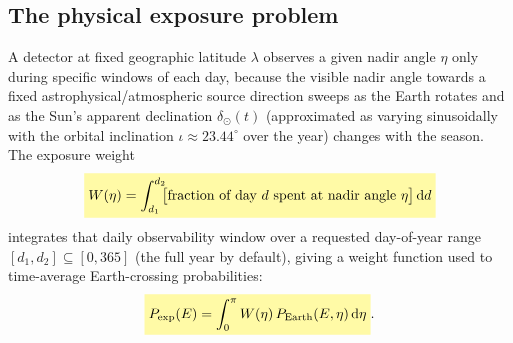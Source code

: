
\begin{theorybox}
\subsection*{The physical exposure problem}
A detector at fixed geographic latitude $\lambda$ observes a given nadir
angle $\eta$ only during specific windows of each day, because the visible
nadir angle towards a fixed astrophysical/atmospheric source direction
sweeps as the Earth rotates and as the Sun's apparent declination
$\delta_\odot(t)$ (approximated as varying sinusoidally with the orbital
inclination $\iota\approx23.44^\circ$ over the year) changes with the
season. The exposure weight
\begin{equation}
  \keyresult{W(\eta) = \int_{d_1}^{d_2}\!\!\bigl[\text{fraction of day } d \text{ spent at nadir angle }\eta\bigr]\,\mathrm{d}d}
\end{equation}
integrates that daily observability window over a requested day-of-year
range $[d_1,d_2]\subseteq[0,365]$ (the full year by default), giving a
weight function used to time-average Earth-crossing probabilities:
\begin{equation}
  \keyresult{P_{\rm exp}(E) = \int_0^\pi W(\eta)\,P_{\rm Earth}(E,\eta)\,\mathrm{d}\eta}.
\end{equation}


\end{theorybox}
